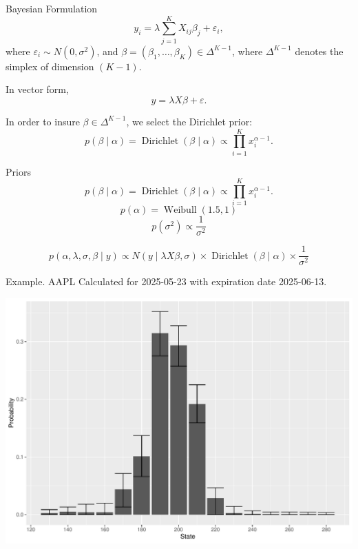 \documentclass[10pt,aspectratio=43]{beamer}
\begin{document}
\begin{frame}{Bayesian Formulation}
    \[y_i=\lambda\sum_{j=1}^KX_{ij}\beta_j+\varepsilon_i,\]
    where $\varepsilon_i\sim N(0,\sigma^2)$, and $\beta=(\beta_1,\dots, \beta_K)\in \Delta^{K-1}$, where $\Delta^{K-1}$ denotes the simplex of dimension $(K-1)$.
    
    In vector form,
    \[y=\lambda X \beta+\varepsilon.\]

    In order to insure $\beta\in \Delta^{K-1}$, we select the Dirichlet prior:
    \[p(\beta\mid \alpha)=\operatorname{Dirichlet}(\beta\mid \alpha)\propto \prod_{i=1}^{K}x_{i}^{\alpha-1}.\]

\end{frame}


\begin{frame}{Priors}
     \[p(\beta\mid \alpha)=\operatorname{Dirichlet}(\beta\mid \alpha)\propto \prod_{i=1}^{K}x_{i}^{\alpha-1}.\]
    \[p(\alpha)=\operatorname{Weibull}(1.5,1)\]
    \[p(\sigma^2)\propto \frac{1}{\sigma^2}\]

    \[p(\alpha,\lambda,\sigma,\beta\mid y)\propto N(y\mid \lambda X\beta,\sigma)\times\operatorname{Dirichlet}(\beta\mid \alpha)\times \frac{1}{\sigma^2}\]

\end{frame}

\begin{frame}{Example. AAPL}
    Calculated for 2025-05-23 with expiration date 2025-06-13.
    \begin{center}
        \includegraphics[width=0.9\linewidth]{betas_23_1.pdf}
    \end{center}
    
\end{frame}
\end{document}
